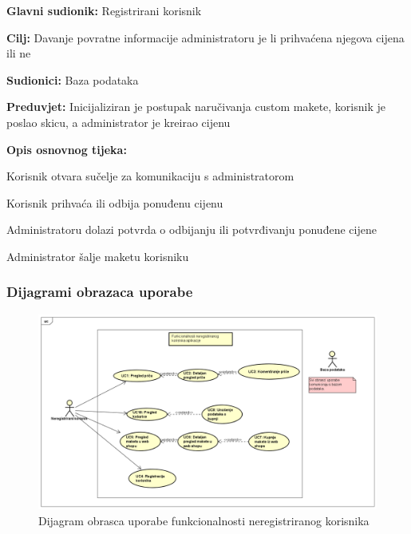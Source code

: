 					\noindent {}
					\begin{packed_item}
						
						\item \textbf{Glavni sudionik: } Registrirani korisnik
						\item  \textbf{Cilj:} Davanje povratne informacije administratoru je li prihvaćena njegova cijena ili ne
						\item  \textbf{Sudionici:} Baza podataka
						\item  \textbf{Preduvjet:} Inicijaliziran je postupak naručivanja custom makete, korisnik je poslao skicu, a administrator je kreirao cijenu
						\item  \textbf{Opis osnovnog tijeka:}
						
						\item[] \begin{packed_enum}
							
							\item Korisnik otvara sučelje za komunikaciju s administratorom
							\item Korisnik prihvaća ili odbija ponuđenu cijenu
							\item Administratoru dolazi potvrda o odbijanju ili potvrđivanju ponuđene cijene
							\item Administrator šalje maketu korisniku
						\end{packed_enum}
						
					\end{packed_item}
				
				\eject
				
				
				\subsubsection{Dijagrami obrazaca uporabe}
					
					
					
					\begin{figure}[h]
						\centering
						\includegraphics[scale=0.32]{"slike/Funkcionalnost neregistriranog korisnika"}
						\caption{Dijagram obrasca uporabe funkcionalnosti neregistriranog korisnika}
						\label{fig:funkcionalnost-neregistriranog-korisnika}   
					\end{figure}
					
